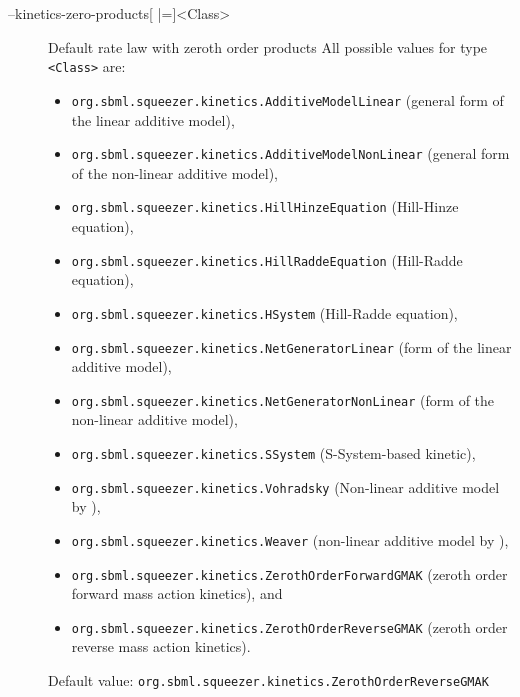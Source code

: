 \begin{description}
\item[--kinetics-zero-products{[} |={]}<Class>]
  Default rate law with zeroth order products
  All possible values for type \texttt{<Class>} are:
  \begin{itemize}
  \item\texttt{org.sbml.squeezer.kinetics.AdditiveModelLinear} (general form of the linear additive model),
  \item\texttt{org.sbml.squeezer.kinetics.AdditiveModelNonLinear} (general form of the non-linear additive model),
  \item\texttt{org.sbml.squeezer.kinetics.HillHinzeEquation} (Hill-Hinze equation),
  \item\texttt{org.sbml.squeezer.kinetics.HillRaddeEquation} (Hill-Radde equation),
  \item\texttt{org.sbml.squeezer.kinetics.HSystem} (Hill-Radde equation),
  \item\texttt{org.sbml.squeezer.kinetics.NetGeneratorLinear} (\NetGenerator form of the linear additive model),
  \item\texttt{org.sbml.squeezer.kinetics.NetGeneratorNonLinear} (\NetGenerator form of the non-linear additive model),
  \item\texttt{org.sbml.squeezer.kinetics.SSystem} (S-System-based kinetic),
  \item\texttt{org.sbml.squeezer.kinetics.Vohradsky} (Non-linear additive model by \citealp*{Vu2007}),
  \item\texttt{org.sbml.squeezer.kinetics.Weaver} (non-linear additive model by \citealp{Weaver1999}),
  \item\texttt{org.sbml.squeezer.kinetics.ZerothOrderForwardGMAK} (zeroth order forward mass action kinetics), and
  \item\texttt{org.sbml.squeezer.kinetics.ZerothOrderReverseGMAK} (zeroth order reverse mass action kinetics).
  \end{itemize}
  Default value: \texttt{org.sbml.squeezer.kinetics.ZerothOrderReverseGMAK}
\end{description}

